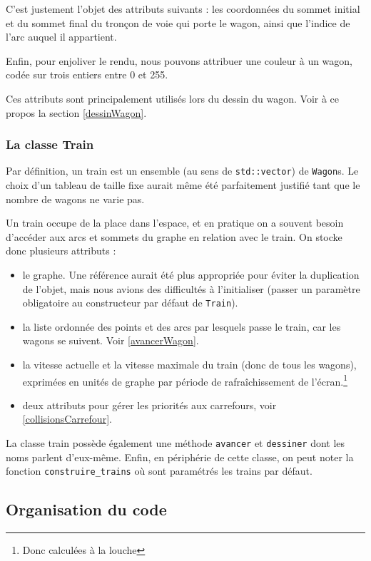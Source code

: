 \documentclass[a4paper, oneside, 11pt, twocolumn]{article}
\begin{document}
C'est justement l'objet des attributs suivants : les coordonnées du sommet initial et du sommet final du tronçon de voie qui porte le wagon, ainsi que l'indice de l'arc auquel il appartient.

Enfin, pour enjoliver le rendu, nous pouvons attribuer une couleur à un wagon, codée sur trois entiers entre 0 et 255.

Ces attributs sont principalement utilisés lors du dessin du wagon. Voir à ce propos la section \ref{dessinWagon}.

\subsubsection{La classe Train}

Par définition, un train est un ensemble (au sens de \texttt{std::vector}) de \texttt{Wagon}s. Le choix d'un tableau de taille fixe aurait même été parfaitement justifié tant que le nombre de wagons ne varie pas.

Un train occupe de la place dans l'espace, et en pratique on a souvent besoin d'accéder aux arcs et sommets du graphe en relation avec le train. On stocke donc plusieurs attributs :

\begin{itemize}
\item le graphe. Une référence aurait été plus appropriée pour éviter la duplication de l'objet, mais nous avions des difficultés à l'initialiser (passer un paramètre obligatoire au constructeur par défaut de \texttt{Train}).
\item la liste ordonnée des points et des arcs par lesquels passe le train, car les wagons se suivent. Voir \ref{avancerWagon}.
\item la vitesse actuelle et la vitesse maximale du train (donc de tous les wagons), exprimées en unités de graphe par période de rafraîchissement de l'écran.\footnote{Donc calculées à la louche}
\item deux attributs pour gérer les priorités aux carrefours, voir \ref{collisionsCarrefour}.
\end{itemize}

La classe train possède également une méthode \texttt{avancer} et \texttt{dessiner} dont les noms parlent d'eux-même. Enfin, en périphérie de cette classe, on peut noter la fonction \texttt{construire\_trains} où sont paramétrés les trains par défaut.

\subsection{Organisation du code}
\end{document}

